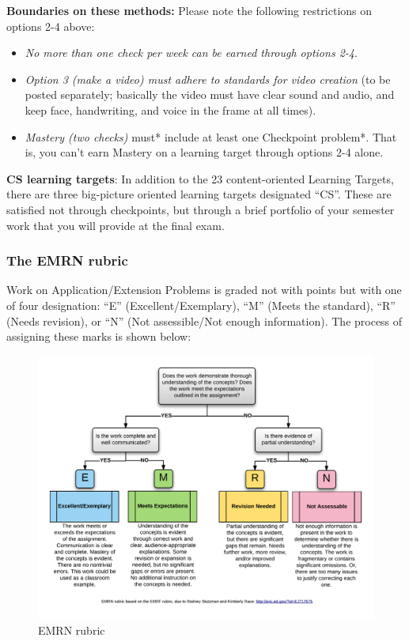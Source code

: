 \documentclass[]{article}
\providecommand{\tightlist}{%
  \setlength{\itemsep}{0pt}\setlength{\parskip}{0pt}}
\begin{document}
\textbf{Boundaries on these methods:} Please note the following
restrictions on options 2-4 above:

\begin{itemize}
\tightlist
\item
  \emph{No more than one check per week can be earned through options
  2-4}.
\item
  \emph{Option 3 (make a video) must adhere to standards for video
  creation} (to be posted separately; basically the video must have
  clear sound and audio, and keep face, handwriting, and voice in the
  frame at all times).
\item
  \emph{Mastery (two checks) }must* include at least one Checkpoint
  problem*. That is, you can't earn Mastery on a learning target through
  options 2-4 alone.
\end{itemize}

\textbf{CS learning targets}: In addition to the 23 content-oriented
Learning Targets, there are three big-picture oriented learning targets
designated ``CS''. These are satisfied not through checkpoints, but
through a brief portfolio of your semester work that you will provide at
the final exam.

\hypertarget{the-emrn-rubric}{%
\subsubsection{The EMRN rubric}\label{the-emrn-rubric}}

Work on Application/Extension Problems is graded not with points but
with one of four designation: ``E'' (Excellent/Exemplary), ``M'' (Meets
the standard), ``R'' (Needs revision), or ``N'' (Not assessible/Not
enough information). The process of assigning these marks is shown
below:

\begin{figure}
\centering
\includegraphics{EMRN.png}
\caption{EMRN rubric}
\end{figure}
\end{document}
